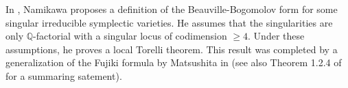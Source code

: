 \documentclass{alggeom}
\newcommand{\Z}{\mathbb{Z}}
\theoremstyle{plain}
\newtheorem{thm}[theorem]{Theorem}
\theoremstyle{definition}
\theoremstyle{remark}
\begin{document}
In \cite{Nanikawa}, Namikawa proposes a definition of the Beauville-Bogomolov form for some singular irreducible symplectic varieties. He assumes that the singularities are only $\mathbb{Q}$-factorial with a singular locus of codimension $\geq 4$. Under these assumptions, he proves a local Torelli theorem. 
This result was completed by a generalization of the Fujiki formula by Matsushita in \cite{Mat} (see also Theorem 1.2.4 of \cite{Lol} for a summaring satement). 
\end{document}
